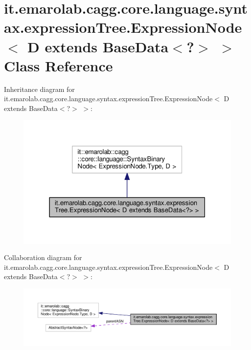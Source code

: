 \hypertarget{classit_1_1emarolab_1_1cagg_1_1core_1_1language_1_1syntax_1_1expressionTree_1_1ExpressionNode_3_3eaf7c0f6a4bc47f4823e05ca883c5af}{\section{it.\-emarolab.\-cagg.\-core.\-language.\-syntax.\-expression\-Tree.\-Expression\-Node$<$ D extends Base\-Data$<$?$>$ $>$ Class Reference}
\label{classit_1_1emarolab_1_1cagg_1_1core_1_1language_1_1syntax_1_1expressionTree_1_1ExpressionNode_3_3eaf7c0f6a4bc47f4823e05ca883c5af}
}


Inheritance diagram for it.\-emarolab.\-cagg.\-core.\-language.\-syntax.\-expression\-Tree.\-Expression\-Node$<$ D extends Base\-Data$<$?$>$ $>$\-:\nopagebreak
\begin{figure}[H]
\begin{center}
\leavevmode
\includegraphics[width=318pt]{classit_1_1emarolab_1_1cagg_1_1core_1_1language_1_1syntax_1_1expressionTree_1_1ExpressionNode_3_8b252814bcf9101588b47bd35f2bde74}
\end{center}
\end{figure}


Collaboration diagram for it.\-emarolab.\-cagg.\-core.\-language.\-syntax.\-expression\-Tree.\-Expression\-Node$<$ D extends Base\-Data$<$?$>$ $>$\-:\nopagebreak
\begin{figure}[H]
\begin{center}
\leavevmode
\includegraphics[width=350pt]{classit_1_1emarolab_1_1cagg_1_1core_1_1language_1_1syntax_1_1expressionTree_1_1ExpressionNode_3_dbf607366f997762d959b5375b63d342}
\end{center}
\end{figure}
